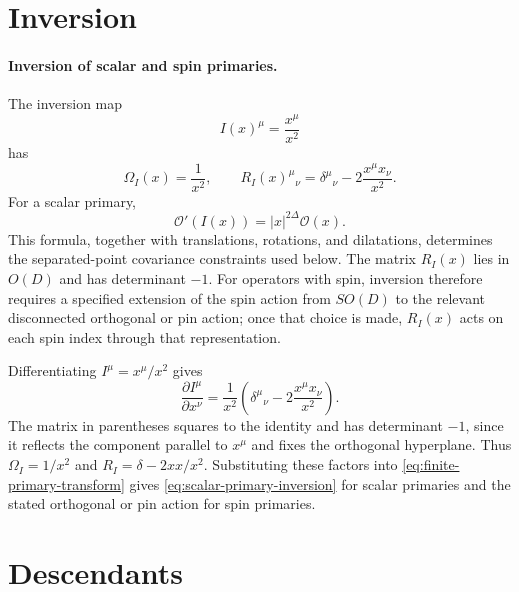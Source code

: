 \section{Inversion}

\paragraph{Inversion of scalar and spin primaries.}
The inversion map
\[
  I(x)^\mu=\frac{x^\mu}{x^2}
\]
has
\[
  \Omega_I(x)=\frac1{x^2},
  \qquad
  R_I(x)^\mu{}_\nu
  =
  \delta^\mu{}_\nu-2\frac{x^\mu x_\nu}{x^2}.
\]
For a scalar primary,
\begin{equation}
  \mathcal O'(I(x))
  =
  |x|^{2\Delta}\mathcal O(x).
  \label{eq:scalar-primary-inversion}
\end{equation}
This formula, together with translations, rotations, and dilatations,
determines the separated-point covariance constraints used below.  The matrix
\(R_I(x)\) lies in \(O(D)\) and has determinant \(-1\).  For operators with
spin, inversion therefore requires a specified extension of the spin action
from \(SO(D)\) to the relevant disconnected orthogonal or pin action; once
that choice is made, \(R_I(x)\) acts on each spin index through that
representation.

Differentiating \(I^\mu=x^\mu/x^2\) gives
\[
  \frac{\partial I^\mu}{\partial x^\nu}
  =
  \frac1{x^2}
  \left(
    \delta^\mu{}_\nu-2\frac{x^\mu x_\nu}{x^2}
  \right).
\]
The matrix in parentheses squares to the identity and has determinant
\(-1\), since it reflects the component parallel to \(x^\mu\) and fixes the
orthogonal hyperplane.  Thus \(\Omega_I=1/x^2\) and
\(R_I=\delta-2xx/x^2\).  Substituting these factors into
\eqref{eq:finite-primary-transform} gives
\eqref{eq:scalar-primary-inversion} for scalar primaries and the stated
orthogonal or pin action for spin primaries.

\section{Descendants}

